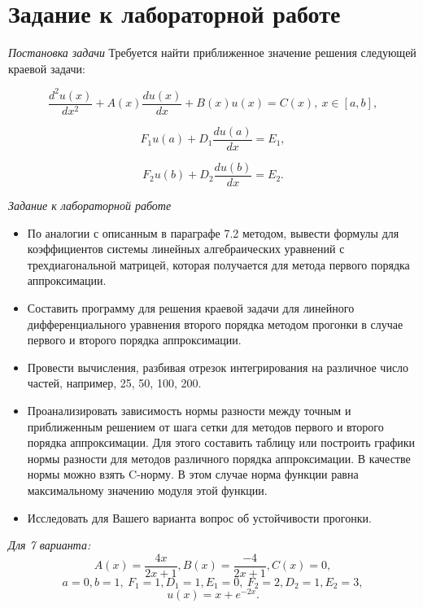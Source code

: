 \documentclass[a4paper,12pt]{article}
\begin{document}


\section{\normalsize{Задание к лабораторной работе}}
\begin{flushleft}
  \textit{Постановка задачи}\linebreak
  Требуется найти приближенное значение решения следующей краевой задачи:

  \begin{equation}\label{eq:pos_1}
    \frac{d^2u(x)}{dx^2} + A(x)\frac{du(x)}{dx} + B(x)u(x) = C(x),~x \in [a,b],
  \end{equation}

  \begin{equation}\label{eq:pos_2}
    F_1u(a) + D_1\frac{du(a)}{dx} = E_1,
  \end{equation}

  \begin{equation}\label{eq:pos_2}
    F_2u(b) + D_2\frac{du(b)}{dx} = E_2.
  \end{equation}

  \textit{Задание к лабораторной работе}\linebreak
  \begin{itemize}
    \item По аналогии с описанным в параграфе 7.2 методом, вывести формулы для коэффициентов системы линейных алгебраических уравнений с трехдиагональной матрицей, которая получается для метода первого порядка аппроксимации.
    \item Составить программу для решения краевой задачи для линейного дифференциального уравнения второго порядка методом прогонки в случае первого и второго порядка аппроксимации.
    \item Провести вычисления, разбивая отрезок интегрирования на различное число частей, например, 25, 50, 100, 200.
    \item Проанализировать зависимость нормы разности между точным и приближенным решением от шага сетки для методов первого и второго порядка аппроксимации. Для этого составить таблицу или построить графики нормы разности для методов различного порядка аппроксимации. В качестве нормы можно взять C-норму. В этом случае норма функции равна максимальному значению модуля этой функции.
    \item Исследовать для Вашего варианта вопрос об устойчивости прогонки.
  \end{itemize}

  \textit{Для 7 варианта:}\linebreak
  \begin{equation}\label{eq:params}
    A(x) = \frac{4x}{2x+1}, B(x) = \frac{-4}{2x+1}, C(x) = 0,
  \end{equation}
  \begin{equation*}
    a = 0, b = 1,~F_1 = 1, D_1 = 1, E_1 = 0,~F_2 = 2, D_2 = 1, E_2 = 3,
  \end{equation*}
  \begin{equation*}
    u(x) = x + e^{-2x}.
  \end{equation*}
\end{flushleft}
\end{document}
